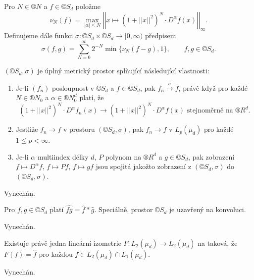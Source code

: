 \documentclass[12pt]{article}					%
\begin{document}
\begin{definice}
	Pro $N \in ®N$ a $f \in ©S_d$ položme
	$$ \nu_N(f) = \max_{|\alpha| ≤ N} \left|\left| x \mapsto (1 + ||x||^2)^N · D^\alpha f(x) \right|\right|_∞. $$
	Definujeme dále funkci $\sigma: ©S_d \times ©S_d \rightarrow [0, ∞)$ předpisem
	$$ \sigma(f, g) = \sum_{N=0}^∞ 2^{-N} \min \{\nu_N (f - g), 1\}, \qquad f, g \in ©S_d. $$
\end{definice}

\begin{veta}
	$(©S_d, \sigma)$ je úplný metrický prostor splňující následující vlastnosti:

	\begin{enumerate}
		\item Je-li $(f_n)$ posloupnost v $©S_d$ a $f \in ©S_d$, pak $f_n \overset{\sigma}{\rightarrow} f$, právě když pro každé $N \in ®N_0$ a $\alpha \in ®N_0^d$ platí, že
			$$ (1 + ||x||^2)^N · D^\alpha f_n(x) \rightarrow (1 + ||x||^2)^N · D^\alpha f(x) \text{ stejnoměrně na } ®R^d. $$
		\item Jestliže $f_n \rightarrow f$ v prostoru $(©S_d, \sigma)$, pak $f_n \rightarrow f$ v $L_p(\mu_d)$ pro každé $1 ≤ p < ∞$.
		\item Je-li $\alpha$ multiindex délky $d$, $P$ polynom na $®R^d$ a $g \in ©S_d$, pak zobrazení $f \mapsto D^\alpha f$, $f \mapsto P f$, $f \mapsto g f$ jsou spojitá jakožto zobrazení z $(©S_d, \sigma)$ do $(©S_d, \sigma)$.
	\end{enumerate}

	\begin{dukazin}
		Vynechán.
	\end{dukazin}
\end{veta}

\begin{dusledek}
	Pro $f, g \in ©S_d$ platí $\widehat{f g} = \hat{f} * \hat{g}$. Speciálně, prostor $©S_d$ je uzavřený na konvoluci.

	\begin{dukazin}
		Vynechán.
	\end{dukazin}
\end{dusledek}

\begin{veta}
	Existuje právě jedna lineární izometrie $F: L_2(\mu_d) \rightarrow L_2(\mu_d)$ na taková, že $F(f) = \hat{f}$ pro každou $f \in L_2(\mu_d) \cap L_1(\mu_d)$.

	\begin{dukazin}
		Vynechán.
	\end{dukazin}
\end{veta}
\end{document}

